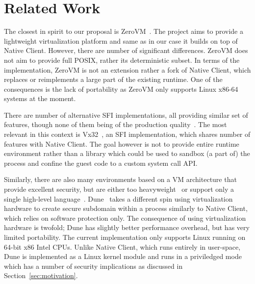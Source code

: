 \section{Related Work}
\label{sec:related}

The closest in spirit to our proposal is ZeroVM~\cite{zerovm}. The
project aims to provide a lightweight virtualization platform and same
as in our case it builds on top of Native Client.  However, there are
number of significant differences. ZeroVM does not aim to provide full
POSIX, rather its deterministic subset. In terms of the implementation,
ZeroVM is not an extension rather a fork of Native Client, which
replaces or reimplements a large part of the existing runtime. One of
the consequences is the lack of portability as ZeroVM only supports
Linux x86-64 systems at the moment.

There are number of alternative SFI implementations, all providing
similar set of features, though none of them being of the production
quality~\cite{small:coots97,mccamant:usenix-sec06}.  The most relevant
in this context is Vx32~\cite{ford:usenix-atc08}, an SFI implementation,
which shares number of features with Native Client. The goal however is
not to provide entire runtime environment rather than a library which
could be used to sandbox (a part of) the process and confine the guest
code to a custom system call API. 


Similarly, there are also many environments based on a VM architecture
that provide excellent security, but are either too
heavyweight~\cite{adl-tabatabai:pldi96,bugnion:tocs97,waldspurger:osdi02,barham:sosp03,ford:fast05}
or support only a single high-level
language~\cite{lindholm:java99,richter:clr10}. Dune~\cite{belay:osdi12}
takes a different spin using virtualization hardware to create secure
subdomain within a process similarly to Native Client, which relies on
software protection only. The consequence of using virtualization
hardware is twofold; Dune has slightly better performance overhead, but
has very limited portability.  The current implementation only supports
Linux running on 64-bit x86 Intel CPUs. Unlike Native Client, which runs
entirely in user-space, Dune is implemented as a Linux kernel module and
runs in a priviledged mode which has a number of security implications
as discussed in Section~\ref{sec:motivation}.

